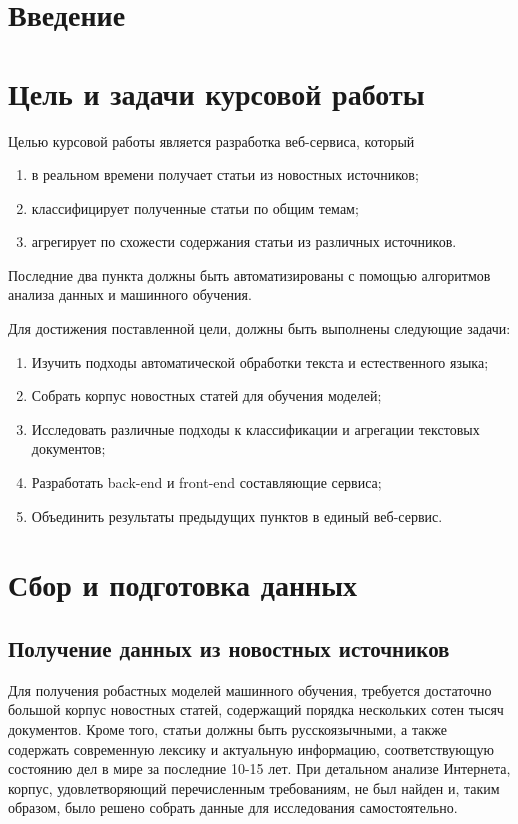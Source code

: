 \documentclass[a4paper, 14pt]{extarticle}
\begin{document}
\section{Введение}
\section{Цель и задачи курсовой работы}
Целью курсовой работы является разработка веб-сервиса, который
\begin{enumerate}
	\item в реальном времени получает статьи из новостных источников;
	\item классифицирует полученные статьи по общим темам;
	\item агрегирует по схожести содержания статьи из различных источников.
\end{enumerate}
Последние два пункта должны быть автоматизированы с помощью алгоритмов анализа данных и машинного обучения.

Для достижения поставленной цели, должны быть выполнены следующие задачи:
\begin{enumerate}
	\item Изучить подходы автоматической обработки текста и естественного языка;
	\item Собрать корпус новостных статей для обучения моделей;
	\item Исследовать различные подходы к классификации и агрегации текстовых документов;
	\item Разработать back-end и front-end составляющие сервиса;
	\item Объединить результаты предыдущих пунктов в единый веб-сервис.
\end{enumerate}
\section{Сбор и подготовка данных}
\subsection{Получение данных из новостных источников}
Для получения робастных моделей машинного обучения, требуется достаточно большой корпус новостных статей,
содержащий порядка нескольких сотен тысяч документов. Кроме того, статьи должны быть русскоязычными, а также
содержать современную лексику и актуальную информацию, соответствующую состоянию дел в мире за последние 10-15 лет.
При детальном анализе Интернета, корпус, удовлетворяющий перечисленным требованиям, не был найден и, таким образом,
было решено собрать данные для исследования самостоятельно.
\end{document}
